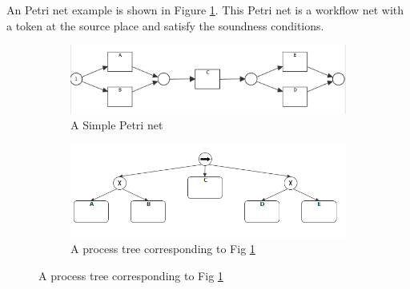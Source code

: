 An Petri net example is shown in Figure \ref{fig:pn-seq-2}. This Petri net is a workflow net with a token at the source place and satisfy the soundness conditions.  
\begin{figure}[!h]
	\centering
	\begin{subfigure}[b]{0.45\textwidth}
		\centering
		\includegraphics[width=\linewidth]{figures/preliminary/PN06_Seq_2_xor_notnested.png}
		\caption{A Simple Petri net}
		\label{fig:pn-seq-2}
	\end{subfigure}%
	\quad
	\begin{subfigure}[b]{0.45\textwidth}
		\centering
		\includegraphics[width=\linewidth]{figures/preliminary/PT06_Seq_2_xor_notnested.png}
		\caption{A process tree corresponding to Fig \ref{fig:pn-seq-2}}
		\label{fig:pt-seq-2}
	\end{subfigure}%
\end{figure}
